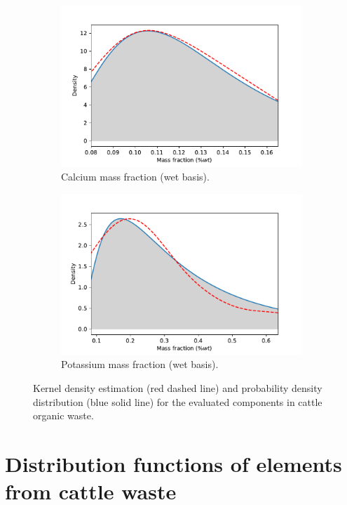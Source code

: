 \begin{refsection}[referencesCh3]
\begin{figure}[h]
	\begin{subfigure}[t]{0.45\textwidth}
		\includegraphics[width=\linewidth]{gfx/AppendixB/Ca_dist.pdf}
		\caption{Calcium mass fraction (wet basis).}
		\label{fig:Ca_KDE}
	\end{subfigure}
	\qquad
	\begin{subfigure}[t]{0.45\textwidth}
		\includegraphics[width=\linewidth]{gfx/AppendixB/K_dist.pdf}
		\caption{Potassium mass fraction (wet basis).}
		\label{fig:K_KDE}
	\end{subfigure}
	\caption{Kernel density estimation (red dashed line) and probability density distribution (blue solid line) for the evaluated components in cattle organic waste.}
	\label{fig:components_distributions}
\end{figure}

\section{Distribution functions of elements from cattle waste}



\end{refsection}
